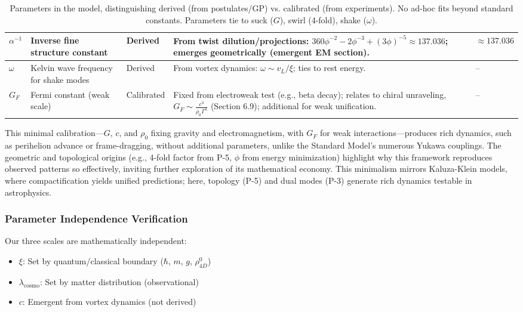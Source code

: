 \begin{table}[H]
\begin{tabularx}{\linewidth}{|p{1.5cm}|p{2cm}|l|X|p{3cm}|}
\hline
$\alpha^{-1}$ & Inverse fine structure constant & Derived & From twist dilution/projections: $360 \phi^{-2} - 2 \phi^{-3} + (3 \phi)^{-5} \approx 137.036$; emerges geometrically (emergent EM section). & $\approx 137.036$ \\
\hline
$\omega$ & Kelvin wave frequency for shake modes & Derived & From vortex dynamics: $\omega \sim v_L / \xi$; ties to rest energy. & -- \\
\hline
$G_F$ & Fermi constant (weak scale) & Calibrated & Fixed from electroweak test (e.g., beta decay); relates to chiral unraveling, $G_F \sim \frac{c^4}{\rho_0 \Gamma^2}$ (Section 6.9); additional for weak unification. & -- \\
\hline
\end{tabularx}
\caption{Parameters in the model, distinguishing derived (from postulates/GP) vs. calibrated (from experiments). No ad-hoc fits beyond standard constants. Parameters tie to suck ($G$), swirl (4-fold), shake ($\omega$).}
\label{tab:parameters}
\end{table}

This minimal calibration---$G$, $c$, and $\rho_0$ fixing gravity and electromagnetism, with $G_F$ for weak interactions---produces rich dynamics, such as perihelion advance or frame-dragging, without additional parameters, unlike the Standard Model's numerous Yukawa couplings. The geometric and topological origins (e.g., 4-fold factor from P-5, $\phi$ from energy minimization) highlight why this framework reproduces observed patterns so effectively, inviting further exploration of its mathematical economy. This minimalism mirrors Kaluza-Klein models, where compactification yields unified predictions; here, topology (P-5) and dual modes (P-3) generate rich dynamics testable in astrophysics.

\subsubsection{Parameter Independence Verification}

Our three scales are mathematically independent:
\begin{itemize}
\item $\xi$: Set by quantum/classical boundary ($\hbar$, $m$, $g$, $\rho_{4D}^0$)
\item $\lambda_{\text{cosmo}}$: Set by matter distribution (observational)
\item $c$: Emergent from vortex dynamics (not derived)
\end{itemize}

